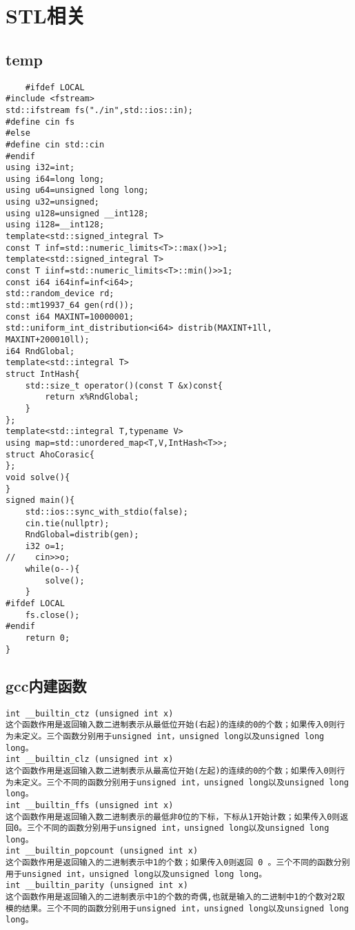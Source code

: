 \documentclass[UTF8]{ctexart}
\begin{document}
\section{STL相关}
\subsection{temp}
\begin{lstlisting}
    #ifdef LOCAL
#include <fstream>
std::ifstream fs("./in",std::ios::in);
#define cin fs
#else
#define cin std::cin
#endif
using i32=int;
using i64=long long;
using u64=unsigned long long;
using u32=unsigned;
using u128=unsigned __int128;
using i128=__int128;
template<std::signed_integral T>
const T inf=std::numeric_limits<T>::max()>>1;
template<std::signed_integral T>
const T iinf=std::numeric_limits<T>::min()>>1;
const i64 i64inf=inf<i64>;
std::random_device rd;
std::mt19937_64 gen(rd());
const i64 MAXINT=10000001;
std::uniform_int_distribution<i64> distrib(MAXINT+1ll, MAXINT+200010ll);
i64 RndGlobal;
template<std::integral T>
struct IntHash{
    std::size_t operator()(const T &x)const{
        return x%RndGlobal;
    }
};
template<std::integral T,typename V>
using map=std::unordered_map<T,V,IntHash<T>>;
struct AhoCorasic{
};
void solve(){
}
signed main(){
    std::ios::sync_with_stdio(false);
    cin.tie(nullptr);
    RndGlobal=distrib(gen);
    i32 o=1;
//    cin>>o;
    while(o--){
        solve();
    }
#ifdef LOCAL
    fs.close();
#endif
    return 0;
}
\end{lstlisting}
\subsection{gcc内建函数}
\begin{lstlisting}
int __builtin_ctz (unsigned int x)
这个函数作用是返回输入数二进制表示从最低位开始(右起)的连续的0的个数；如果传入0则行为未定义。三个函数分别用于unsigned int，unsigned long以及unsigned long long。
int __builtin_clz (unsigned int x)
这个函数作用是返回输入数二进制表示从最高位开始(左起)的连续的0的个数；如果传入0则行为未定义。三个不同的函数分别用于unsigned int，unsigned long以及unsigned long long。
int __builtin_ffs (unsigned int x)
这个函数作用是返回输入数二进制表示的最低非0位的下标，下标从1开始计数；如果传入0则返回0。三个不同的函数分别用于unsigned int，unsigned long以及unsigned long long。
int __builtin_popcount (unsigned int x)
这个函数作用是返回输入的二进制表示中1的个数；如果传入0则返回 0 。三个不同的函数分别用于unsigned int，unsigned long以及unsigned long long。
int __builtin_parity (unsigned int x)
这个函数作用是返回输入的二进制表示中1的个数的奇偶,也就是输入的二进制中1的个数对2取模的结果。三个不同的函数分别用于unsigned int，unsigned long以及unsigned long long。
\end{lstlisting}
\end{document}

